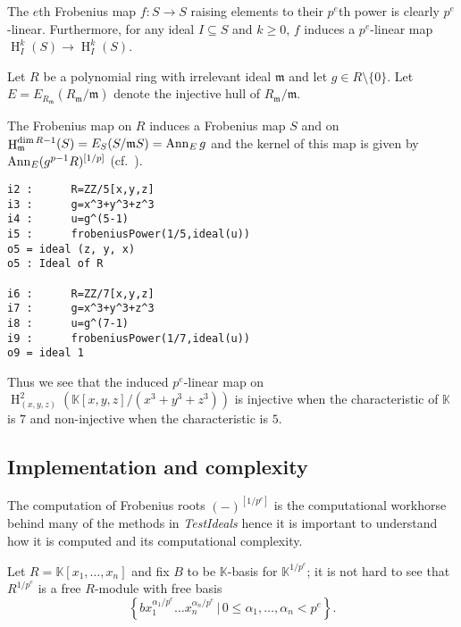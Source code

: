 \documentclass[11pt]{amsart}
\DeclareMathOperator{\HH}{H}
\begin{document}
\begin{example}
The $e$th Frobenius map $f:S \rightarrow S$  raising elements to their $p^e$th power is clearly $p^{e}$-linear.
Furthermore, for any ideal $I\subseteq S$ and $k\geq 0$, $f$ induces a $p^{e}$-linear map $\HH_I^k (S) \rightarrow \HH_I^k (S)$.
\end{example}

Let $R$ be a polynomial ring with irrelevant ideal $\mathfrak{m}$ and let $g\in R\setminus \{0\}$.
Let $E=E_{R_{\mathfrak{m}}}(R_{\mathfrak{m}}/\mathfrak{m})$ denote the injective hull of $R_{\mathfrak{m}}/\mathfrak{m}$.

The Frobenius map on $R$ induces a Frobenius map $S$ and on
$\HH^{\dim R-1}_{\mathfrak{m}} (S)=E_S(S/\mathfrak{m}S)=\Ann_E g$ and the kernel of this map is given by
$\operatorname{{Ann}}_E (g^{p-1}R)^{[1/p]}$ (cf.~\cite[\S 5]{KatzmanParameterTestIdealOfCMRings}).

\begin{verbatim}
i2 :      R=ZZ/5[x,y,z]
i3 :      g=x^3+y^3+z^3
i4 :      u=g^(5-1)
i5 :      frobeniusPower(1/5,ideal(u))
o5 = ideal (z, y, x)
o5 : Ideal of R

i6 :      R=ZZ/7[x,y,z]
i7 :      g=x^3+y^3+z^3
i8 :      u=g^(7-1)
i9 :      frobeniusPower(1/7,ideal(u))
o9 = ideal 1
\end{verbatim}

Thus we see that the induced $p^{e}$-linear map on $\HH_{(x,y,z)}^{2} \left( \mathbb{K}[x,y,z]/(x^3+y^3+z^3) \right)$ is injective
when the characteristic of $\mathbb{K}$ is $7$ and non-injective when the characteristic is $5$.

\subsection{Implementation and complexity}

The computation of Frobenius roots $(-)^{[1/p^e]}$ is the computational workhorse behind many of the methods in \emph{TestIdeals}
hence it is important to understand how it is computed and its computational complexity. 

Let $R=\mathbb{K}[x_1, \dots, x_n]$ and fix $B$ to be $\mathbb{K}$-basis for $\mathbb{K}^{1/p^e}$;
it is not hard to see that $R^{1/p^e}$ is a free $R$-module with free basis
$$\left\{ b x_1^{\alpha_1/p^e} \dots x_n^{\alpha_n/p^e} \,|\, 0\leq \alpha_1, \dots, \alpha_n < p^e \right\}.$$
\end{document}

